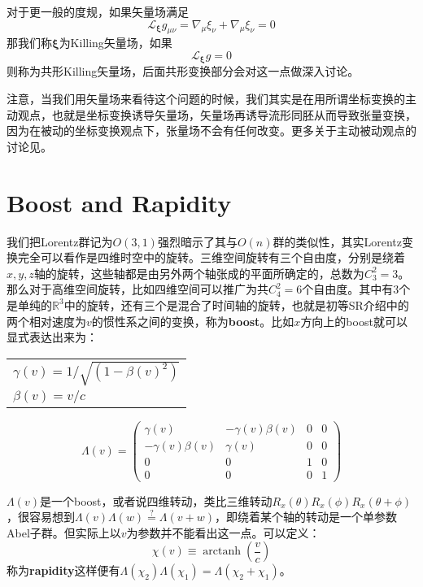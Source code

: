 对于更一般的度规，如果矢量场满足
\[\mathscr{L}_\mathbf{\xi} g_{\mu\nu}=\nabla_\mu\xi_\nu+\nabla_\mu\xi_\nu=0\]
那我们称$\mathbf{\xi}$为Killing矢量场，如果
\[\mathscr{L}_\mathbf{\xi} g=0\]
则称为共形Killing矢量场，后面共形变换部分会对这一点做深入讨论。
\begin{remark}
	注意，当我们用矢量场来看待这个问题的时候，我们其实是在用所谓坐标变换的主动观点，也就是坐标变换诱导矢量场，矢量场再诱导流形同胚从而导致张量变换，因为在被动的坐标变换观点下，张量场不会有任何改变。更多关于主动被动观点的讨论见\cite{lcb}。
\end{remark}
\section{Boost and Rapidity}
我们把Lorentz群记为$O(3,1)$强烈暗示了其与$O(n)$群的类似性，其实Lorentz变换完全可以看作是四维时空中的旋转。三维空间旋转有三个自由度，分别是绕着$x,y,z$轴的旋转，这些轴都是由另外两个轴张成的平面所确定的，总数为$C_3^2=3$。那么对于高维空间旋转，比如四维空间可以推广为共$C_4^2=6$个自由度。其中有3个是单纯的$\mathbb{R}^3$中的旋转，还有三个是混合了时间轴的旋转，也就是初等SR介绍中的两个相对速度为$v$的惯性系之间的变换，称为\textbf{boost}。比如$x$方向上的boost就可以显式表达出来为：
\begin{margintable}\footnotesize 
	\begin{tabularx}{\marginparwidth}{|X}
		$\gamma(v)=1/\sqrt{(1-\beta(v)^2)}$\\
		$\beta(v)=v/c$
	\end{tabularx}
\end{margintable}
\begin{equation}
	\Lambda(v)=\begin{pmatrix}
		\gamma(v)&-\gamma(v)\beta(v)  &0  & 0\\
		-\gamma(v)\beta(v) & \gamma(v) &0  &0 \\
		0&0  & 1 &0 \\
		0&  0&  0&1
	\end{pmatrix}
\end{equation}

$\Lambda(v)$是一个boost，或者说四维转动，类比三维转动$R_x(\theta)R_x(\phi)R_x(\theta+\phi)$，很容易想到$\Lambda(v)\Lambda(w)\overset{?}{=}\Lambda(v+w)$，即绕着某个轴的转动是一个单参数Abel子群。但实际上以$v$为参数并不能看出这一点。可以定义：
\begin{equation}
	\chi(v)\equiv\operatorname{arctanh}(\frac{v}{c})
\end{equation}
称为\textbf{rapidity}这样便有$\Lambda(\chi_2)\Lambda(\chi_1)=\Lambda(\chi_2+\chi_1)$。

